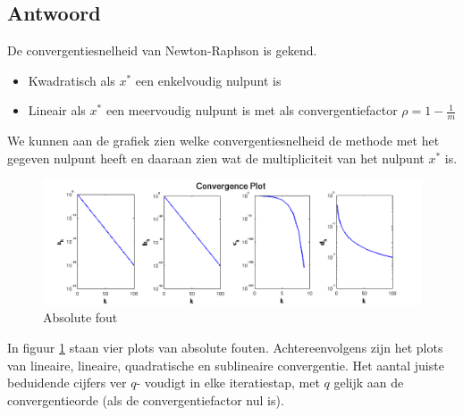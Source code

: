 \documentclass[examenvragen.tex]{subfiles}
\begin{document}
\subsection{Antwoord}
De convergentiesnelheid van Newton-Raphson is gekend.
\begin{itemize}
\item Kwadratisch als $x^*$ een enkelvoudig nulpunt is
\item Lineair als $x^*$ een meervoudig nulpunt is met als convergentiefactor $\rho = 1-\frac{1}{m}$
\end{itemize}
We kunnen aan de grafiek zien welke convergentiesnelheid de methode met het gegeven nulpunt heeft en daaraan zien wat de multipliciteit van het nulpunt $x^{*}$ is.
\begin{figure}[H]
\begin{center}
\includegraphics[scale=0.5]{illustraties/vraag_newton_raphson_vijfdegraads_veelterm.png}
\end{center}
\caption{Absolute fout}
\label{fig:vraag_newton_raphson_vijfdegraads_veelterm:abs_err}
\end{figure}
In figuur \ref{fig:vraag_newton_raphson_vijfdegraads_veelterm:abs_err} staan vier plots van absolute fouten. Achtereenvolgens zijn het plots van lineaire, lineaire, quadratische en sublineaire convergentie.
Het aantal juiste beduidende cijfers ver $q$- voudigt in elke iteratiestap, met $q$ gelijk aan de convergentieorde (als de convergentiefactor nul is).
\end{document}
